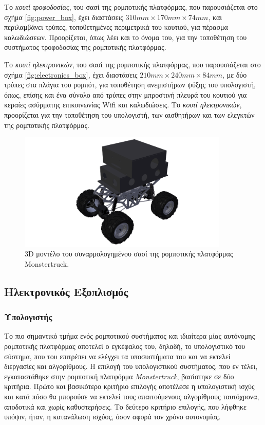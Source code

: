 \bigskip
Το \textit{κουτί τροφοδοσίας}, του σασί της ρομποτικής πλατφόρμας, που παρουσιάζεται στο σχήμα \ref{fig:power_box}, έχει διαστάσεις $310mm \times 170mm \times 74mm$, και περιλαμβάνει τρύπες, τοποθετημένες περιμετρικά του κουτιού, για πέρασμα καλωδιώσεων. Προορίζεται, όπως λέει και το όνομα του, για την τοποθέτηση του συστήματος τροφοδοσίας της ρομποτικής πλατφόρμας.

\bigskip
Το \textit{κουτί ηλεκτρονικών}, του σασί της ρομποτικής πλατφόρμας, που παρουσιάζεται στο σχήμα \ref{fig:electronics_box}, έχει διαστάσεις $210mm\times 240mm\times 84mm$, με δύο τρύπες στα πλάγια του ρομπότ, για τοποθέτηση ανεμιστήρων ψύξης του υπολογιστή, όπως, επίσης και ένα σύνολο από τρύπες στην μπροστινή πλευρά του κουτιού για κεραίες ασύρματης επικοινωνίας Wifi και καλωδιώσεις. Το \textit{κουτί ηλεκτρονικών}, προορίζεται για την τοποθέτηση του υπολογιστή, των αισθητήρων και των ελεγκτών της ρομποτικής πλατφόρμας.

\begin{figure}[!ht]
	\begin{center}
		\includegraphics[width=10cm]{Chapters/Chapter2/Figures/base_diag.png}
		\caption{3D μοντέλο του συναρμολογημένου σασί της ρομποτικής πλατφόρμας Monstertruck.}
		\label{fig:chassis}
	\end{center}
\end{figure}

\bigskip
\subsection{Ηλεκτρονικός Εξοπλισμός} \label{ssec:electronic_equipment}

\bigskip
\subsubsection{Υπολογιστής} \label{sssec:computer}
Το πιο σημαντικό τμήμα ενός ρομποτικού συστήματος και ιδιαίτερα μίας αυτόνομης ρομποτικής πλατφόρμας αποτελεί ο εγκέφαλος του, δηλαδή, το υπολογιστικό του σύστημα, που του επιτρέπει να ελέγχει τα υποσυστήματα του και να εκτελεί διεργασίες και αλγορίθμους. Η επιλογή του υπολογιστικού συστήματος, που εν τέλει, εγκαταστάθηκε στην ρομποτική πλατφόρμα \textit{Monstertruck}, βασίστηκε σε δύο κριτήρια. Πρώτο και βασικότερο κριτήριο επιλογής αποτέλεσε η υπολογιστική ισχύς και κατά πόσο θα μπορούσε να εκτελεί τους απαιτούμενους αλγορίθμους ταυτόχρονα, αποδοτικά και χωρίς καθυστερήσεις. Το δεύτερο κριτήριο επιλογής, που λήφθηκε υπόψιν, ήταν, η κατανάλωση ισχύος, όσον αφορά τον χρόνο αυτονομίας.

